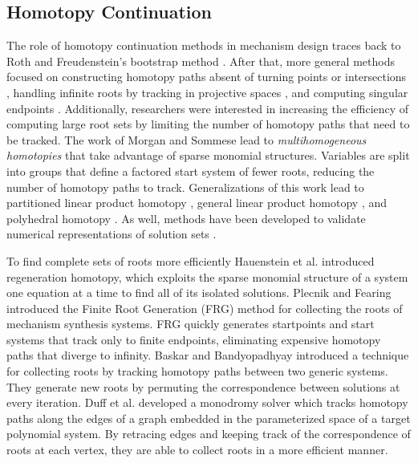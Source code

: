 \documentclass[journal]{IEEEtran}
\begin{document}
\subsection{Homotopy Continuation}
\label{sec:homotopy}

The role of homotopy continuation methods in mechanism design traces back to Roth and Freudenstein's bootstrap method \cite{rothSynthesisPathGeneratingMechanisms1963}. %
After that, more general methods focused on constructing homotopy paths absent of turning points or intersections \cite{zangwillPathwaysSolutionsFixed1981}, handling infinite roots by tracking in projective spaces \cite{wrightFindingAllSolutions1985}, and computing singular endpoints \cite{morganPowerSeriesMethod1992}. %
Additionally, researchers were interested in increasing the efficiency of computing large root sets by limiting the number of homotopy paths that need to be tracked. %
The work of Morgan and Sommese \cite{morganHomotopySolvingGeneral1987} lead to \textit{multihomogeneous homotopies} that take advantage of sparse monomial structures.  Variables are split into groups that define a factored start system of fewer roots, reducing the number of homotopy paths to track. %
Generalizations of this work lead to partitioned linear product homotopy \cite{verscheldeGBQAlgorithmConstructingStart1993,wiseAlgorithm801POLSYS2000}, general linear product homotopy \cite{verscheldeSymbolicHomotopyConstruction1993,verscheldeAlgorithm795PHCpack1999,suAlgorithm857POLSYS2006}, and polyhedral homotopy \cite{verscheldeHomotopiesExploitingNewton1994,huberPolyhedralMethodSolving1995,leykinPolyhedralHomotopies2019}. %
As well, methods have been developed to validate numerical representations of solution sets \cite{hauensteinAlgorithm921AlphaCertified2012,leykinTraceTest2018}.


To find complete sets of roots more efficiently Hauenstein et al. \cite{hauensteinRegenerationHomotopiesSolving2011} introduced regeneration homotopy, which exploits the sparse monomial structure of a system one equation at a time to find all of its isolated solutions. %
Plecnik and Fearing \cite{plecnikFindingOnlyFinite2017,plecnikStudyFindingFinite2017} introduced the Finite Root Generation (FRG) method for collecting the roots of mechanism synthesis systems.  FRG quickly generates startpoints and start systems that track only to finite endpoints, eliminating expensive homotopy paths that diverge to infinity. %
Baskar and Bandyopadhyay \cite{baskarAlgorithmComputeFinite2019} introduced a technique for collecting roots by tracking homotopy paths between two generic systems.  They generate new roots by permuting the correspondence between solutions at every iteration. %
Duff et al. \cite{duffSolvingPolynomialSystems} developed a monodromy solver which tracks homotopy paths along the edges of a graph embedded in the parameterized space of a target polynomial system.
By retracing edges and keeping track of the correspondence of roots at each vertex, they are able to collect roots in a more efficient manner. %
\end{document}
